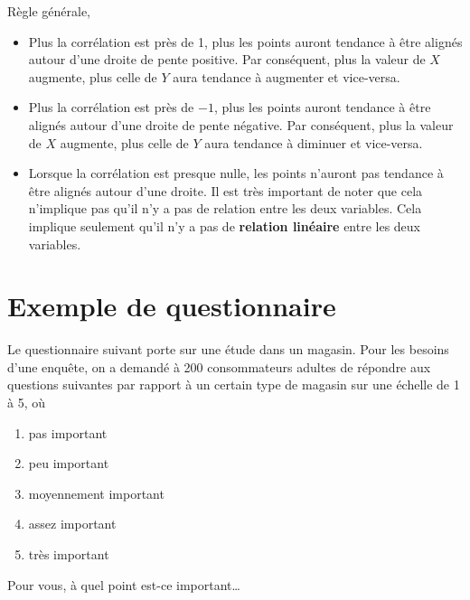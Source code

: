 \documentclass[
  11pt,
  letterpaper,
]{book}
\providecommand{\tightlist}{%
  \setlength{\itemsep}{0pt}\setlength{\parskip}{0pt}}
\theoremstyle{definition}
\theoremstyle{definition}
\theoremstyle{definition}
\theoremstyle{remark}
\begin{document}
Règle générale,

\begin{itemize}
\tightlist
\item
  Plus la corrélation est près de 1, plus les points auront tendance à être alignés autour d'une droite de pente positive. Par conséquent, plus la valeur de \(X\) augmente, plus celle de \(Y\) aura tendance à augmenter et vice-versa.
\item
  Plus la corrélation est près de \(-1\), plus les points auront tendance à être alignés autour d'une droite de pente négative. Par conséquent, plus la valeur de \(X\) augmente, plus celle de \(Y\) aura tendance à diminuer et vice-versa.
\item
  Lorsque la corrélation est presque nulle, les points n'auront pas tendance à être alignés autour d'une droite. Il est très important de noter que cela n'implique pas qu'il n'y a pas de relation entre les deux variables. Cela implique seulement qu'il n'y a pas de \textbf{relation linéaire} entre les deux variables.
\end{itemize}

\hypertarget{exemple-de-questionnaire}{%
\section{Exemple de questionnaire}\label{exemple-de-questionnaire}}

Le questionnaire suivant porte sur une étude dans un magasin. Pour les besoins d'une enquête, on a demandé à 200 consommateurs adultes de répondre aux questions suivantes par rapport à un certain type de magasin sur une échelle de 1 à 5, où

\begin{enumerate}
\def\labelenumi{\arabic{enumi}.}
\tightlist
\item
  pas important
\item
  peu important
\item
  moyennement important
\item
  assez important
\item
  très important
\end{enumerate}

Pour vous, à quel point est-ce important\ldots
\end{document}
